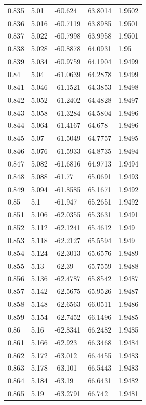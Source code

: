 \begin{tabular}{lllll}
0.835 & 5.01 & -60.624 & 63.8014 & 1.9502 \\
0.836 & 5.016 & -60.7119 & 63.8985 & 1.9501 \\
0.837 & 5.022 & -60.7998 & 63.9958 & 1.9501 \\
0.838 & 5.028 & -60.8878 & 64.0931 & 1.95 \\
0.839 & 5.034 & -60.9759 & 64.1904 & 1.9499 \\
0.84 & 5.04 & -61.0639 & 64.2878 & 1.9499 \\
0.841 & 5.046 & -61.1521 & 64.3853 & 1.9498 \\
0.842 & 5.052 & -61.2402 & 64.4828 & 1.9497 \\
0.843 & 5.058 & -61.3284 & 64.5804 & 1.9496 \\
0.844 & 5.064 & -61.4167 & 64.678 & 1.9496 \\
0.845 & 5.07 & -61.5049 & 64.7757 & 1.9495 \\
0.846 & 5.076 & -61.5933 & 64.8735 & 1.9494 \\
0.847 & 5.082 & -61.6816 & 64.9713 & 1.9494 \\
0.848 & 5.088 & -61.77 & 65.0691 & 1.9493 \\
0.849 & 5.094 & -61.8585 & 65.1671 & 1.9492 \\
0.85 & 5.1 & -61.947 & 65.2651 & 1.9492 \\
0.851 & 5.106 & -62.0355 & 65.3631 & 1.9491 \\
0.852 & 5.112 & -62.1241 & 65.4612 & 1.949 \\
0.853 & 5.118 & -62.2127 & 65.5594 & 1.949 \\
0.854 & 5.124 & -62.3013 & 65.6576 & 1.9489 \\
0.855 & 5.13 & -62.39 & 65.7559 & 1.9488 \\
0.856 & 5.136 & -62.4787 & 65.8542 & 1.9487 \\
0.857 & 5.142 & -62.5675 & 65.9526 & 1.9487 \\
0.858 & 5.148 & -62.6563 & 66.0511 & 1.9486 \\
0.859 & 5.154 & -62.7452 & 66.1496 & 1.9485 \\
0.86 & 5.16 & -62.8341 & 66.2482 & 1.9485 \\
0.861 & 5.166 & -62.923 & 66.3468 & 1.9484 \\
0.862 & 5.172 & -63.012 & 66.4455 & 1.9483 \\
0.863 & 5.178 & -63.101 & 66.5443 & 1.9483 \\
0.864 & 5.184 & -63.19 & 66.6431 & 1.9482 \\
0.865 & 5.19 & -63.2791 & 66.742 & 1.9481 \\

\end{tabular}
